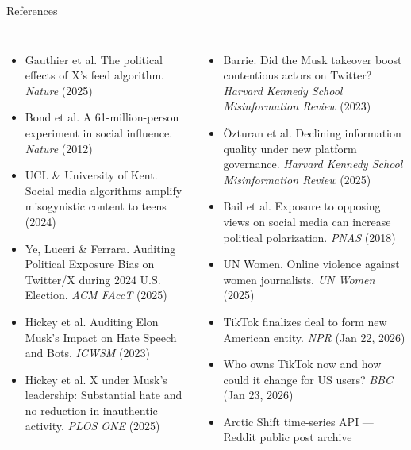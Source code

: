 \documentclass[aspectratio=169,t]{beamer}
\begin{document}
\begin{frame}{References}
\begin{columns}[T]
    \begin{itemize}\setlength\itemsep{0.3em}\scriptsize
      \item Gauthier et al. The political effects of X's feed algorithm. \textit{Nature} (2025)
      \item Bond et al. A 61-million-person experiment in social influence. \textit{Nature} (2012)
      \item UCL \& University of Kent. Social media algorithms amplify misogynistic content to teens (2024)
      \item Ye, Luceri \& Ferrara. Auditing Political Exposure Bias on Twitter/X during 2024 U.S. Election. \textit{ACM FAccT} (2025)
      \item Hickey et al. Auditing Elon Musk's Impact on Hate Speech and Bots. \textit{ICWSM} (2023)
      \item Hickey et al. X under Musk's leadership: Substantial hate and no reduction in inauthentic activity. \textit{PLOS ONE} (2025)
    \end{itemize}

    \begin{itemize}\setlength\itemsep{0.3em}\scriptsize
      \item Barrie. Did the Musk takeover boost contentious actors on Twitter? \textit{Harvard Kennedy School Misinformation Review} (2023)
      \item {\"O}zturan et al. Declining information quality under new platform governance. \textit{Harvard Kennedy School Misinformation Review} (2025)
      \item Bail et al. Exposure to opposing views on social media can increase political polarization. \textit{PNAS} (2018)
      \item UN Women. Online violence against women journalists. \textit{UN Women} (2025)
      \item TikTok finalizes deal to form new American entity. \textit{NPR} (Jan 22, 2026)
      \item Who owns TikTok now and how could it change for US users? \textit{BBC} (Jan 23, 2026)\\
      \item Arctic Shift time-series API — Reddit public post archive
    \end{itemize}
\end{columns}
\end{frame}
\end{document}
